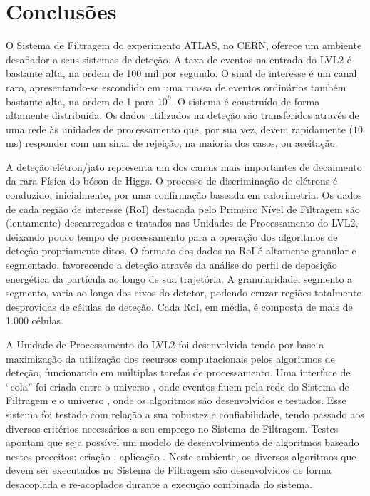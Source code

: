 \typeout{ ====================================================================}
\typeout{ ====================================================================}

\chapter{Conclusões}
\label{chap:conclusions}

O Sistema de Filtragem do experimento ATLAS, no CERN, oferece um ambiente
desafiador a seus sistemas de deteção. A taxa de eventos na entrada do LVL2 é
bastante alta, na ordem de 100 mil por segundo. O sinal de interesse é um
canal raro, apresentando-se escondido em uma massa de eventos ordinários também
bastante alta, na ordem de 1 para $10^9$. O sistema é construído de forma
altamente distribuída. Os dados utilizados na deteção são transferidos através
de uma rede às unidades de processamento que, por sua vez, devem rapidamente
($10$ ms) responder com um sinal de rejeição, na maioria dos casos, ou
aceitação.

A deteção elétron/jato representa um dos canais mais importantes de decaimento
da rara Física do bóson de Higgs. O processo de discriminação de elétrons é
conduzido, inicialmente, por uma confirmação baseada em calorimetria. Os dados
de cada região de interesse (RoI) destacada pelo Primeiro Nível de Filtragem
são (lentamente) descarregados e tratados nas Unidades de Processamento do
LVL2, deixando pouco tempo de processamento para a operação dos algoritmos de
deteção propriamente ditos. O formato dos dados na RoI é altamente granular e
segmentado, favorecendo a deteção através da análise do perfil de deposição
energética da partícula ao longo de sua trajetória. A granularidade, segmento
a segmento, varia ao longo dos eixos do detetor, podendo cruzar regiões
totalmente desprovidas de células de deteção. Cada RoI, em média, é composta
de mais de 1.000 células.

A Unidade de Processamento do LVL2 foi desenvolvida tendo por base a
maximização da utilização dos recursos computacionais pelos algoritmos de
deteção, funcionando em múltiplas tarefas de processamento. Uma interface de
``cola'' foi criada entre o universo , onde eventos fluem pela
rede do Sistema de Filtragem e o universo
, onde os algoritmos são desenvolvidos e testados. Esse sistema
foi testado com relação a sua robustez e confiabilidade, tendo passado aos diversos
critérios necessários a seu emprego no Sistema de Filtragem. Testes apontam
que seja possível um modelo de desenvolvimento de algoritmos baseado nestes
preceitos: criação , aplicação
. Neste ambiente, os diversos algoritmos que devem ser executados
no Sistema de Filtragem são desenvolvidos de forma desacoplada e re-acoplados
durante a execução combinada do sistema.

